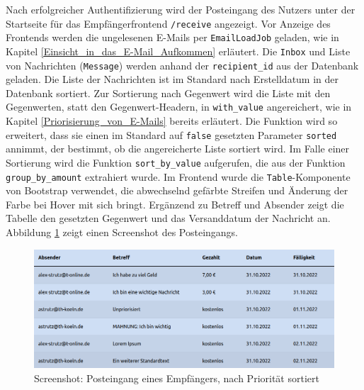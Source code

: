 \noindent Nach erfolgreicher Authentifizierung wird der Posteingang des Nutzers unter der Startseite für das Empfängerfrontend \texttt{/receive} angezeigt. Vor Anzeige des Frontends werden die ungelesenen E-Mails per \texttt{EmailLoadJob} geladen, wie in Kapitel \ref{Einsicht_in_das_E-Mail_Aufkommen} erläutert. Die \texttt{Inbox} und Liste von Nachrichten (\texttt{Message}) werden anhand der \texttt{recipient\_id} aus der Datenbank geladen. Die Liste der Nachrichten ist im Standard nach Erstelldatum in der Datenbank sortiert. Zur Sortierung nach Gegenwert wird die Liste mit den Gegenwerten, statt den Gegenwert-Headern, in \texttt{with\_value} angereichert, wie in Kapitel \ref{Priorisierung_von_E-Mails} bereits erläutert. Die Funktion wird so erweitert, dass sie einen im Standard auf \texttt{false} gesetzten Parameter \texttt{sorted} annimmt, der bestimmt, ob die angereicherte Liste sortiert wird. Im Falle einer Sortierung wird die Funktion \texttt{sort\_by\_value} aufgerufen, die aus der Funktion \texttt{group\_by\_amount} extrahiert wurde. Im Frontend wurde die \texttt{Table}-Komponente von Bootstrap verwendet, die abwechselnd gefärbte Streifen und Änderung der Farbe bei Hover mit sich bringt. Ergänzend zu Betreff und Absender zeigt die Tabelle den gesetzten Gegenwert und das Versanddatum der Nachricht an. Abbildung \ref{fig:screenshot_inbox} zeigt einen Screenshot des Posteingangs.

\begin{figure}[!ht]
	\centering
		\includegraphics[width=1\textwidth]{Figures/inbox.png}
	\caption{Screenshot: Posteingang eines Empfängers, nach Priorität sortiert}
	\label{fig:screenshot_inbox}
\end{figure}

